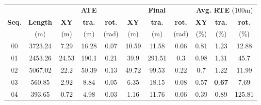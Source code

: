 \begin{table}[h]
    \centering
    {\small
        \begin{tabular}{c|c|ccc|ccc|ccc}
            \hline
                          &                 & \multicolumn{3}{c|}{\textbf{ATE}} & \multicolumn{3}{c|}{\textbf{Final}} & \multicolumn{3}{c}{\textbf{Avg. RTE} (100m)}                                                                                                \\
            \textbf{Seq.} & \textbf{Length} & \textbf{XY}                       & \textbf{tra.}                       & \textbf{rot.}                                & \textbf{XY}   & \textbf{tra.} & \textbf{rot.} & \textbf{XY}  & \textbf{tra.} & \textbf{rot.} \\
                          & (m)             & (m)                               & (m)                                 & (rad)                                        & (m)           & (m)           & (rad)         & (\%)         & (\%)          & (\%)          \\
            \hline \hline
            00            & 3723.24         & 7.29                              & 16.28                               & 0.07                                         & 10.59         & 11.58         & 0.06          & 0.81         & 1.23          & 12.88         \\
            01            & 2453.26         & 24.53                             & 190.1                               & 0.21                                         & 39.9          & 291.51        & 0.3           & 0.98         & 1.31          & 45.7          \\
            02            & 5067.02         & 22.2                              & 50.39                               & 0.13                                         & 49.72         & 99.53         & 0.22          & 0.7          & 1.22          & 11.99         \\
            03            & 560.85          & 2.92                              & 8.84                                & 0.05                                         & 6.35          & 18.15         & 0.08          & 0.57         & \textbf{0.67} & 7.69          \\
            04            & 393.65          & 0.72                              & 4.98                                & 0.03                                         & 1.16          & 11.76         & 0.06          & 0.39         & 0.89          & 125.81        \\

\end{tabular}}
\end{table}
